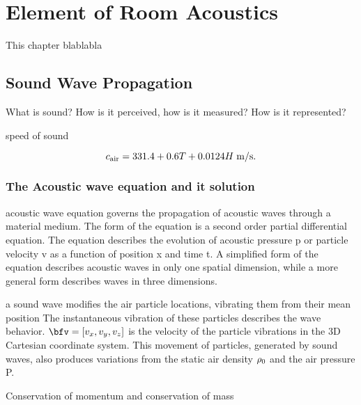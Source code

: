 \chapter{Element of Room Acoustics}\label{chap:acoustics}

 This chapter blablabla

\section{Sound Wave Propagation}
What is sound? How is it perceived, how is it measured? How is it represented?

speed of sound

\begin{equation}
    c_\text{air} =  331.4 + 0.6T + 0.0124H \; \text{m/s}
    .
\end{equation}

\subsection{The Acoustic wave equation and it solution}
\label{subsec:acoustics:waveq}
acoustic wave equation governs the propagation of acoustic waves through a material medium.
The form of the equation is a second order partial differential equation.
The equation describes the evolution of acoustic pressure p or particle velocity v as a function of position x and time t.
A simplified form of the equation describes acoustic waves in only one spatial dimension, while a more general form describes waves in three dimensions.


a sound wave modifies the air particle locations, vibrating them from their mean position
The instantaneous vibration of these particles describes the wave behavior.
$\bfv = \klist{v_x, v_y, v_z}$ is the velocity of the particle vibrations in the 3D Cartesian coordinate system.
This movement of particles, generated by sound waves, also produces variations from the static air density $\rho_0$ and the air pressure P.

Conservation of momentum and conservation of mass



